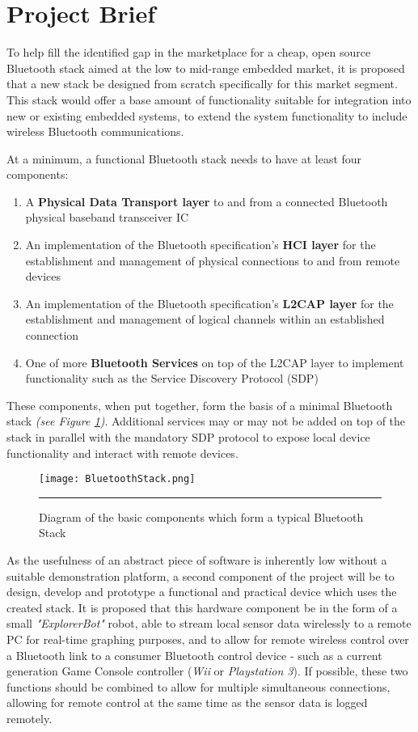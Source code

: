 \section{Project Brief}

To help fill the identified gap in the marketplace for a cheap, open source Bluetooth stack aimed at the low to mid-range embedded market, it is proposed that a new stack be designed from scratch specifically for this market segment. This stack would offer a base amount of functionality suitable for integration into new or existing embedded systems, to extend the system functionality to include wireless Bluetooth communications.

At a minimum, a functional Bluetooth stack needs to have at least four components:

\begin{enumerate}
	\item A \textbf{Physical Data Transport layer} to and from a connected Bluetooth physical baseband transceiver IC
	\item An implementation of the Bluetooth specification's \textbf{HCI layer} for the establishment and management of physical connections to and from remote devices
	\item An implementation of the Bluetooth specification's \textbf{L2CAP layer} for the establishment and management of logical channels within an established connection
	\item One of more \textbf{Bluetooth Services} on top of the L2CAP layer to implement functionality such as the Service Discovery Protocol (SDP)
\end{enumerate}

These components, when put together, form the basis of a minimal Bluetooth stack \emph{(see Figure \ref{fig:btstack})}. Additional services may or may not be added on top of the stack in parallel with the mandatory SDP protocol to expose local device functionality and interact with remote devices.

\begin{figure}[H]
	\centering
		\texttt{[image: BluetoothStack.png]}
	\rule{35em}{0.5pt}
	\caption[Diagram of a typical Bluetooth Stack]{Diagram of the basic components which form a typical Bluetooth Stack}
	\label{fig:btstack}
\end{figure}

As the usefulness of an abstract piece of software is inherently low without a suitable demonstration platform, a second component of the project will be to design, develop and prototype a functional and practical device which uses the created stack. It is proposed that this hardware component be in the form of a small \textit{"ExplorerBot"} robot, able to stream local sensor data wirelessly to a remote PC for real-time graphing purposes, and to allow for remote wireless control over a Bluetooth link to a consumer Bluetooth control device - such as a current generation Game Console controller (\textit{Wii} or \textit{Playstation 3}). If possible, these two functions should be combined to allow for multiple simultaneous connections, allowing for remote control at the same time as the sensor data is logged remotely.

